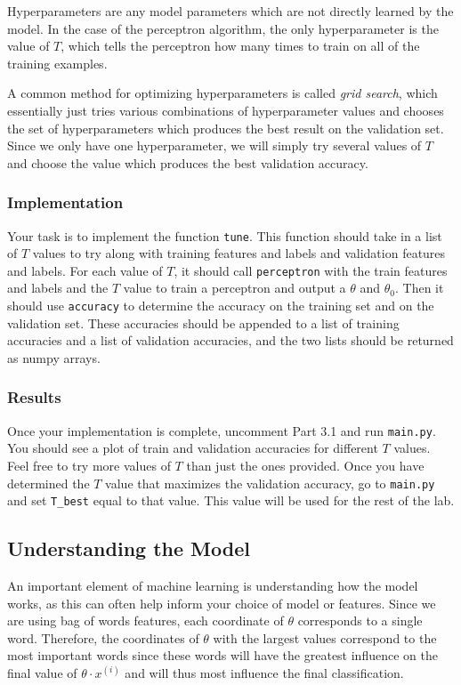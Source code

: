 \documentclass{article}
\begin{document}
Hyperparameters are any model parameters which are not directly learned by the model. In the case of the perceptron algorithm, the only hyperparameter is the value of $T$, which tells the perceptron how many times to train on all of the training examples.

A common method for optimizing hyperparameters is called \textit{grid search}, which essentially just tries various combinations of hyperparameter values and chooses the set of hyperparameters which produces the best result on the validation set. Since we only have one hyperparameter, we will simply try several values of $T$ and choose the value which produces the best validation accuracy.

\subsubsection{Implementation}

Your task is to implement the function \texttt{tune}. This function should take in a list of $T$ values to try along with training features and labels and validation features and labels. For each value of $T$, it should call \texttt{perceptron} with the train features and labels and the $T$ value to train a perceptron and output a $\theta$ and $\theta_0$. Then it should use \texttt{accuracy} to determine the accuracy on the training set and on the validation set. These accuracies should be appended to a list of training accuracies and a list of validation accuracies, and the two lists should be returned as numpy arrays.

\subsubsection{Results}

Once your implementation is complete, uncomment Part 3.1 and run \texttt{main.py}. You should see a plot of train and validation accuracies for different $T$ values. Feel free to try more values of $T$ than just the ones provided. Once you have determined the $T$ value that maximizes the validation accuracy, go to \texttt{main.py} and set \texttt{T\_best} equal to that value. This value will be used for the rest of the lab.

\subsection{Understanding the Model}

An important element of machine learning is understanding how the model works, as this can often help inform your choice of model or features. Since we are using bag of words features, each coordinate of $\theta$ corresponds to a single word. Therefore, the coordinates of $\theta$ with the largest values correspond to the most important words since these words will have the greatest influence on the final value of $\theta \cdot x^{(i)}$ and will thus most influence the final classification.
\end{document}
